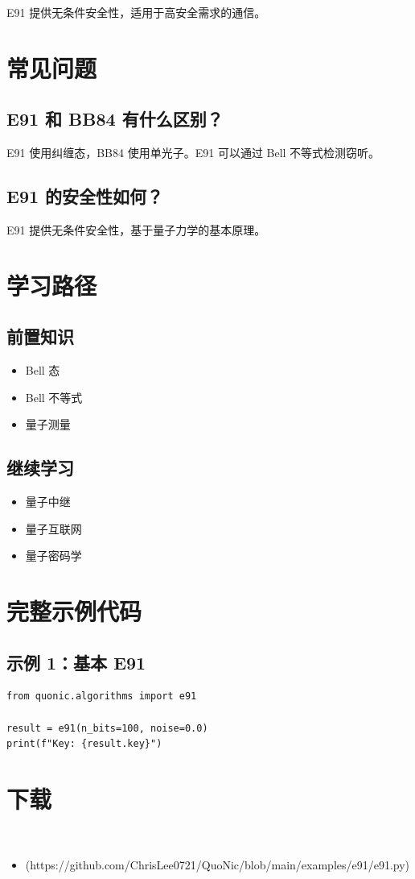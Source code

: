 \documentclass[12pt,a4paper]{article}
\begin{document}
E91 提供无条件安全性，适用于高安全需求的通信。

\section{常见问题}

\subsection{E91 和 BB84 有什么区别？}

E91 使用纠缠态，BB84 使用单光子。E91 可以通过 Bell 不等式检测窃听。

\subsection{E91 的安全性如何？}

E91 提供无条件安全性，基于量子力学的基本原理。

\section{学习路径}

\subsection{前置知识}
\begin{itemize}
  \item Bell 态
  \item Bell 不等式
  \item 量子测量
\end{itemize}

\subsection{继续学习}
\begin{itemize}
  \item 量子中继
  \item 量子互联网
  \item 量子密码学
\end{itemize}

\section{完整示例代码}

\subsection{示例 1：基本 E91}

\begin{lstlisting}[style=python]
from quonic.algorithms import e91

result = e91(n_bits=100, noise=0.0)
print(f"Key: {result.key}")
\end{lstlisting}


\section{下载}

\begin{itemize}
  \item [e91.py](https://github.com/ChrisLee0721/QuoNic/blob/main/examples/e91/e91.py)
\end{itemize}
\end{document}
